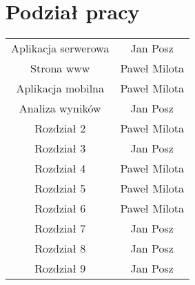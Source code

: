 \chapter{Podział pracy}
\label{cha:podzial_prac}

\begin{center}
\begin{tabular}{ |c|c| } 
 \hline
 Aplikacja serwerowa & Jan Posz \\ 
 Strona www & Paweł Milota \\ 
 Aplikacja mobilna & Paweł Milota \\ 
 Analiza wyników & Jan Posz \\
 Rozdział 2 & Paweł Milota \\ 
 Rozdział 3 & Jan Posz \\ 
 Rozdział 4 & Paweł Milota \\
 Rozdział 5 & Paweł Milota \\
 Rozdział 6 & Paweł Milota \\
 Rozdział 7 & Jan Posz \\
 Rozdział 8 & Jan Posz \\
 Rozdział 9 & Jan Posz \\
 \hline
\end{tabular}
\end{center}